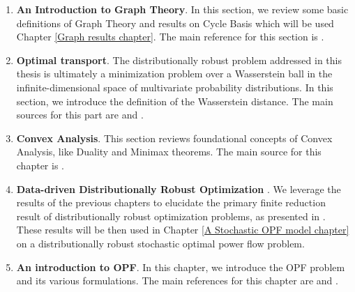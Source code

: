 \documentclass[11pt,a4paper,oneside,openany]{book}
\numberwithin{definition}{section}
\numberwithin{theorem}{section}
\numberwithin{problem}{section}
\begin{document}
\begin{enumerate}
\item \textbf{An Introduction to Graph Theory}. In this section, we review some basic definitions of Graph Theory and results on Cycle Basis which will be used Chapter \ref{Graph results chapter}. The main reference for this section is \cite{CycleBasesInGraphs}.


\item \textbf{Optimal transport}. The distributionally robust problem addressed in this thesis is ultimately a minimization problem over a Wasserstein ball in the infinite-dimensional space of multivariate probability distributions. In this section, we introduce the definition of the Wasserstein distance. The main sources for this part are \cite{ambrosio} and \cite{villani}.

\item \textbf{Convex Analysis}. This section reviews foundational concepts of Convex Analysis, like Duality and Minimax theorems. The main source for this chapter is \cite{convexbook}.

\item \textbf{Data-driven Distributionally Robust Optimization} . We leverage the results of the previous chapters to elucidate the primary finite reduction result of distributionally robust optimization problems, as presented in \cite{distibRobWasserstein}. These results will be then used in Chapter \ref{A Stochastic OPF model chapter} on a distributionally robust stochastic optimal power flow problem.

\item \textbf{An introduction to OPF}. In this chapter, we introduce the OPF problem and its various formulations. The main references for this chapter are \cite{IntroOPF} and \cite{MathProgForm}.



\end{enumerate}
\end{document}
